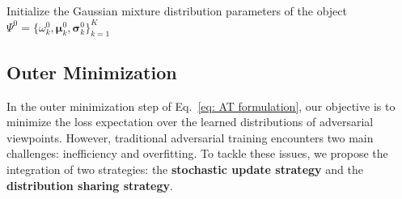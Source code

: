 \documentclass[10pt,journal,compsoc]{IEEEtran}
\begin{document}
\begin{algorithm}[htb]
\small
 \caption{\small GMVFool Algorithm}	\label{alg1}
 
Initialize the Gaussian mixture distribution parameters of the object $\Psi^0=\{\omega^0_k , \boldsymbol{\mu}^0_k, \boldsymbol{\sigma}^0_k \}_{k=1}^K$\;

\end{algorithm}

\subsection{Outer Minimization}
\label{sec:Defense}

In the outer minimization step of Eq.~\eqref{eq: AT formulation}, our objective is to minimize the loss expectation over the learned distributions of adversarial viewpoints. However, traditional adversarial training encounters two main challenges: inefficiency and overfitting. To tackle these issues, we propose the integration of two strategies: the \textbf{stochastic update strategy} and the \textbf{distribution sharing strategy}.
\end{document}
